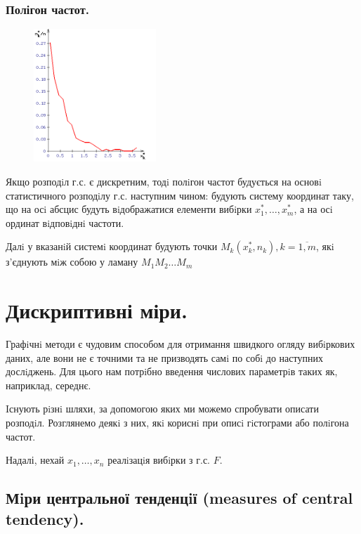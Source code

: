 \subsubsection{Полігон частот.}
\begin{figure}
\vspace*{-2em}
\centering
\includegraphics[width=0.41\textwidth]{assets/lectures_part_5-567b0078.png}
\end{figure}
Якщо розподiл г.с. є дискретним, тодi полiгон частот будується на основi статистичного
розподiлу г.с. наступним чином: будують систему координат таку, що на осi абсцис будуть вiдображатися елементи вибiрки $x_1^*, \dots , x_m^*$, а на осi ординат вiдповiднi частоти.\par Далi у вказанiй системi координат будують точки $M_k (x_k^*, n_k), k= \overline{1,m}$, якi з’єднують
мiж собою у ламану $M_1M_2\dots M_m$
\newpage
\section{Дискриптивні міри.}
Графiчнi методи є чудовим способом для отримання швидкого огляду вибiркових даних, але
вони не є точними та не призводять самi по собi до наступних дослiджень. Для цього нам
потрiбно введення числових параметрiв таких як, наприклад, середнє.\par
Iснують рiзнi шляхи, за допомогою яких ми можемо спробувати описати розподiл. Розглянемо
деякi з них, якi кориснi при описi гiстограми або полiгона частот.\par
Надалі, нехай $x_1, \dots, x_n$ реалiзацiя вибiрки з г.с. $F$.

\subsection{Мiри центральної тенденцiї (measures of central tendency).}
